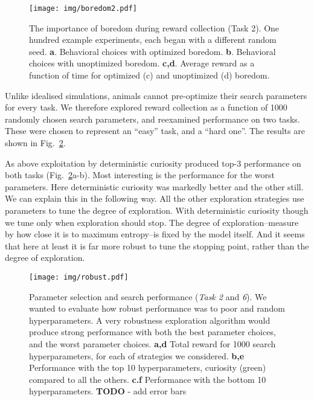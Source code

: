 \begin{figure}
	\begin{fullwidth}
	\texttt{[image: img/boredom2.pdf]} 
	\caption{The importance of boredom during reward collection (Task 2). One hundred example experiments, each began with a different random seed. 
	\textbf{a}. Behavioral choices with optimized boredom.
	\textbf{b}. Behavioral choices with unoptimized boredom.
	\textbf{c,d}. Average reward as a function of time for optimized (c) and unoptimized (d) boredom.
	}
	\label{fig:boredom2} 
	\end{fullwidth}
\end{figure}

Unlike idealised simulations, animals cannot pre-optimize their search parameters for every task. We therefore explored reward collection as a function of 1000 randomly chosen search parameters, and reexamined performance on two tasks. These were chosen to represent an ``easy'' task, and a ``hard one''. The results are shown in Fig.~\ref{fig:robust}. 

As above exploitation by deterministic curiosity produced top-3 performance on both tasks (Fig.~\ref{fig:robust}a-b). Most interesting is the performance for the worst parameters. Here deterministic curiosity was markedly better and the other still. We can explain this in the following way. All the other exploration strategies use parameters to tune the degree of exploration. With deterministic curiosity though we tune only when exploration should stop. The degree of exploration--measure by how close it is to maximum entropy--is fixed by the model itself. And it seems that here at least it is far more robust to tune the stopping point, rather than the degree of exploration.

\begin{figure}
	\begin{fullwidth}
	\texttt{[image: img/robust.pdf]} 
	\caption{Parameter selection and search performance (\textit{Task 2} and \textit{6}). We wanted to evaluate how robust performance was to poor and random hyperparameters. A very robustness exploration algorithm would produce strong performance with both the best parameter choices, and the worst parameter choices.   
	\textbf{a,d} Total reward for 1000 search hyperparameters, for each of strategies we considered.  
	\textbf{b,e} Performance with the top 10 hyperparameters, curiosity (green) compared to all the others.
	\textbf{c.f} Performance with the bottom 10 hyperparameters.
	\textbf{TODO} - add error bars
	}
	\label{fig:robust}
	\end{fullwidth}
\end{figure}

